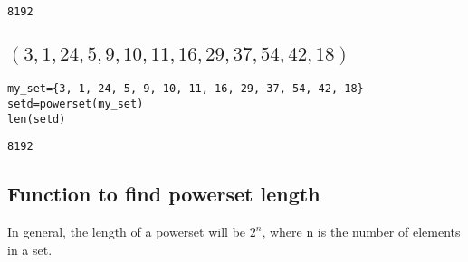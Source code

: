 \documentclass[11pt]{article}
\begin{document}
\begin{verbatim}
8192
\end{verbatim}

\subsection{\((3, 1, 24, 5, 9, 10, 11, 16, 29, 37, 54, 42, 18)\)}
\label{sec:org5f8ffcf}
\begin{verbatim}
my_set={3, 1, 24, 5, 9, 10, 11, 16, 29, 37, 54, 42, 18}
setd=powerset(my_set)
len(setd)
\end{verbatim}

\begin{verbatim}
8192
\end{verbatim}

\subsection{Function to find powerset length}
\label{sec:orgffaee6d}
In general, the length of a powerset will be \(2^{n}\), where n is the number of elements in a set.
\end{document}
